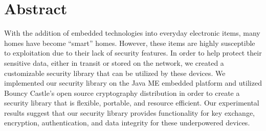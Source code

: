 \section{Abstract}
With the addition of embedded technologies into everyday electronic items, many homes have become ``smart'' homes. However, these items are highly susceptible to exploitation due to their lack of security features. In order to help protect their sensitive data, either in transit or stored on the network, we created a customizable security library that can be utilized by these devices. We implemented our security library on the Java ME embedded platform and utilized Bouncy Castle's open source cryptography distribution in order to create a security library that is flexible, portable, and resource efficient. Our experimental results suggest that our security library provides functionality for key exchange, encryption, authentication, and data integrity for these underpowered devices.
